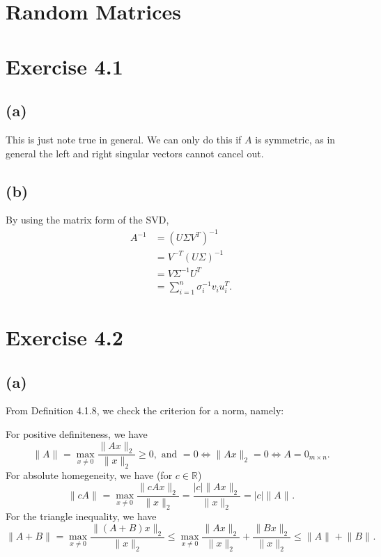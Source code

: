 \section{Random Matrices}


\section*{Exercise 4.1}
\subsection*{(a)}
This is just note true in general. We can only do this if $A$ is symmetric, as in general the left and right 
singular vectors cannot cancel out.

\subsection*{(b)}
By using the matrix form of the SVD, 
\begin{align*}
	A^{-1} 
	&= (U \Sigma V^T)^{-1} \\
	&= V^{-T} (U \Sigma)^{-1} \\
	&= V \Sigma^{-1} U^T \\
	&= \sum_{i = 1}^{n} \sigma_i^{-1} v_i u_i^T.
\end{align*}


\newpage
\section*{Exercise 4.2}
\subsection*{(a)}
From Definition 4.1.8, we check the criterion for a norm, namely:

For positive definiteness, we have 
\[ \lVert A \rVert_{} = \max_{x \neq 0} \frac{\lVert Ax \rVert_{2}}{\lVert x \rVert_{2}} \geq 0, \text{ and } 
= 0 \iff \lVert Ax \rVert_{2} = 0 \iff A = 0_{m \times n}. \]
For absolute homegeneity, we have (for $c \in \mathbb{R}$)
\[ \lVert cA \rVert_{} = \max_{x \neq 0} \frac{\lVert cAx \rVert_{2}}{\lVert x \rVert_{2}} 
= \frac{|c|\lVert Ax \rVert_{2}}{\lVert x \rVert_{2}} = |c|\lVert A \rVert_{}. \]
For the triangle inequality, we have 
\[ \lVert A + B \rVert_{} = \max_{x \neq 0} \frac{\lVert (A + B)x \rVert_{2}}{\lVert x \rVert_{2}} 
\leq \max_{x \neq 0} \frac{\lVert Ax \rVert_{2}}{\lVert x \rVert_{2}} 
+ \frac{\lVert Bx \rVert_{2}}{\lVert x \rVert_{2}} \leq \lVert A \rVert_{} + \lVert B \rVert_{}. \]


